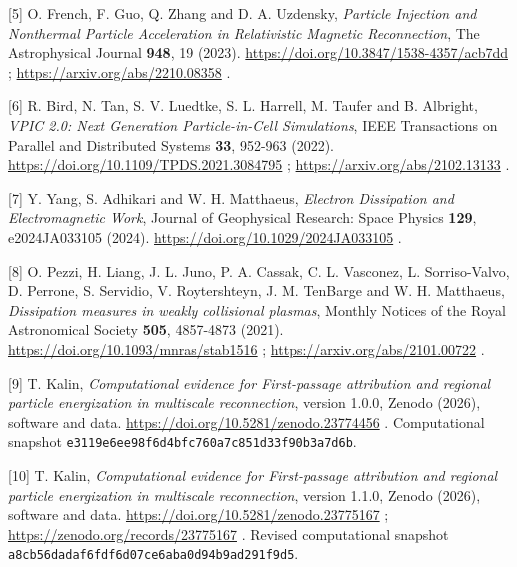\begin{samepage}
{[}5{]} O. French, F. Guo, Q. Zhang and D. A. Uzdensky, \emph{Particle
Injection and Nonthermal Particle Acceleration in Relativistic Magnetic
Reconnection}, The Astrophysical Journal \textbf{948}, 19 (2023).
\url{https://doi.org/10.3847/1538-4357/acb7dd} ;
\url{https://arxiv.org/abs/2210.08358} .
\end{samepage}

\begin{samepage}
{[}6{]} R. Bird, N. Tan, S. V. Luedtke, S. L. Harrell, M. Taufer and B.
Albright, \emph{VPIC 2.0: Next Generation Particle-in-Cell Simulations},
IEEE Transactions on Parallel and Distributed Systems \textbf{33},
952-963 (2022). \url{https://doi.org/10.1109/TPDS.2021.3084795} ;
\url{https://arxiv.org/abs/2102.13133} .
\end{samepage}

\begin{samepage}
{[}7{]} Y. Yang, S. Adhikari and W. H. Matthaeus, \emph{Electron
Dissipation and Electromagnetic Work}, Journal of Geophysical Research:
Space Physics \textbf{129}, e2024JA033105 (2024).
\url{https://doi.org/10.1029/2024JA033105} .
\end{samepage}

\begin{samepage}
{[}8{]} O. Pezzi, H. Liang, J. L. Juno, P. A. Cassak, C. L. Vasconez, L.
Sorriso-Valvo, D. Perrone, S. Servidio, V. Roytershteyn, J. M. TenBarge
and W. H. Matthaeus, \emph{Dissipation measures in weakly collisional
plasmas}, Monthly Notices of the Royal Astronomical Society
\textbf{505}, 4857-4873 (2021).
\url{https://doi.org/10.1093/mnras/stab1516} ;
\url{https://arxiv.org/abs/2101.00722} .
\end{samepage}

\begin{samepage}
{[}9{]} T. Kalin, \emph{Computational evidence for First-passage
attribution and regional particle energization in multiscale
reconnection}, version 1.0.0, Zenodo (2026), software and data.
\url{https://doi.org/10.5281/zenodo.23774456} . Computational snapshot
\nolinkurl{e3119e6ee98f6d4bfc760a7c851d33f90b3a7d6b}.
\end{samepage}

\begin{samepage}
{[}10{]} T. Kalin, \emph{Computational evidence for First-passage
attribution and regional particle energization in multiscale
reconnection}, version 1.1.0, Zenodo (2026), software and data.
\url{https://doi.org/10.5281/zenodo.23775167} ;
\url{https://zenodo.org/records/23775167} . Revised computational
snapshot \nolinkurl{a8cb56dadaf6fdf6d07ce6aba0d94b9ad291f9d5}.
\end{samepage}

